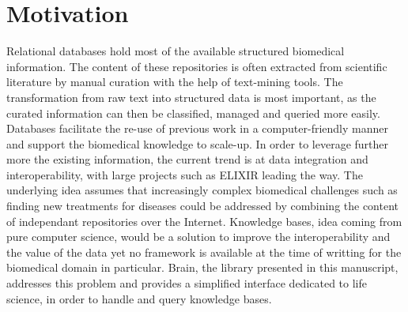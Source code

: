 \documentclass{bioinfo}
\begin{document}
\section{Motivation}
Relational databases hold most of the available structured biomedical information. The content of these repositories is often
extracted from scientific literature by manual curation with the help of text-mining tools. The transformation from raw text into
structured data is most important, as the curated information can then be classified, managed and queried more easily. Databases facilitate
the re-use of previous work in a computer-friendly manner and support the biomedical knowledge to scale-up. In order to leverage further 
more the existing information, the current trend is at data integration and interoperability, with large projects such as ELIXIR leading the way.
The underlying idea assumes that increasingly complex biomedical challenges such as finding new treatments for diseases could be addressed 
by combining the content of independant repositories over the Internet. Knowledge bases, idea coming from pure computer science, would be a 
solution to improve the interoperability and the value of the data yet no framework is available at the time of writting for the biomedical 
domain in particular. Brain, the library presented in this manuscript, addresses this problem and provides a simplified interface dedicated to 
life science, in order to handle and query knowledge bases.
\end{document}
